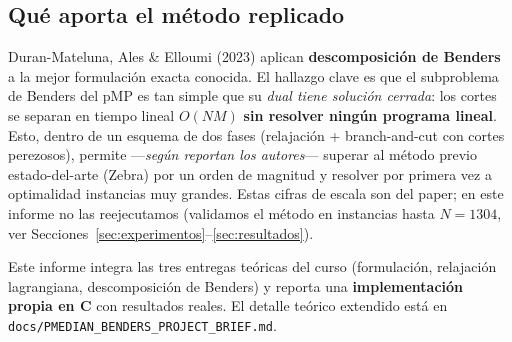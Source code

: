 \subsection{Qué aporta el método replicado}
Duran-Mateluna, Ales \& Elloumi (2023) aplican \textbf{descomposición de Benders} a la mejor
formulación exacta conocida. El hallazgo clave es que el subproblema de Benders del pMP es tan
simple que su \emph{dual tiene solución cerrada}: los cortes se separan en tiempo lineal $O(NM)$
\textbf{sin resolver ningún programa lineal}. Esto, dentro de un esquema de dos fases (relajación
+ branch-and-cut con cortes perezosos), permite —\emph{según reportan los autores}— superar al
método previo estado-del-arte (Zebra) por un orden de magnitud y resolver por primera vez a
optimalidad instancias muy grandes. Estas cifras de escala son del paper; en este informe no las
reejecutamos (validamos el método en instancias hasta $N=1304$, ver Secciones~\ref{sec:experimentos}–\ref{sec:resultados}).

Este informe integra las tres entregas teóricas del curso (formulación, relajación lagrangiana,
descomposición de Benders) y reporta una \textbf{implementación propia en C} con resultados
reales. El detalle teórico extendido está en \texttt{docs/PMEDIAN\_BENDERS\_PROJECT\_BRIEF.md}.
